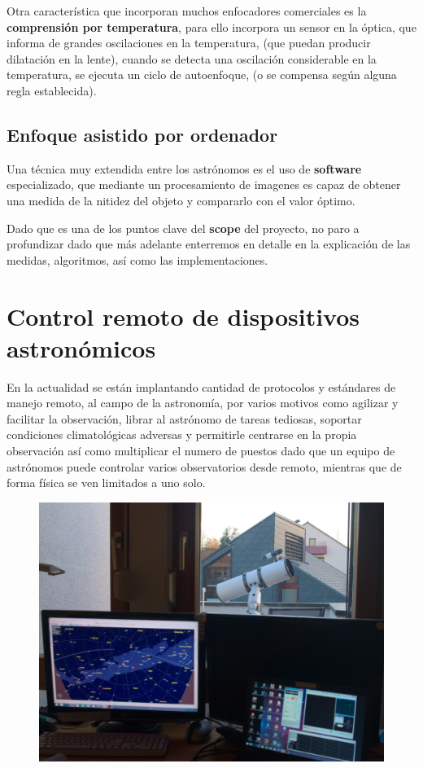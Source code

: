 \bigskip
Otra característica que incorporan muchos enfocadores comerciales es la \textbf{comprensión por temperatura}, para ello incorpora un sensor en la óptica, que informa de grandes oscilaciones en la temperatura, (que puedan producir dilatación en la lente), 
cuando se detecta una oscilación considerable en la temperatura, se ejecuta un ciclo de autoenfoque, (o se compensa según alguna regla establecida).


\subsection{Enfoque asistido por ordenador}

Una técnica muy extendida entre los astrónomos es el uso de \textbf{software} especializado, que mediante un procesamiento de imagenes es capaz de obtener una medida de la nitidez del objeto y compararlo con el valor óptimo.

\bigskip
Dado que es una de los puntos clave del \textbf{scope} del proyecto, no paro a profundizar dado que más adelante enterremos en detalle en la explicación de las medidas, algoritmos, así como las implementaciones.  


\newpage
\section{Control remoto de dispositivos astronómicos}

En la actualidad se están implantando cantidad de protocolos y estándares de manejo remoto, al campo de la astronomía, por varios  motivos como agilizar y facilitar la observación, librar al astrónomo de tareas tediosas, soportar condiciones climatológicas adversas y permitirle centrarse en la propia observación así como multiplicar el numero de puestos dado que un equipo de astrónomos puede controlar varios observatorios desde remoto, mientras que de forma física se ven limitados a uno solo. 

\begin{figure}[h]
\centering
\includegraphics[width=0.7\linewidth]{../images/robotizacion}
\caption{}
\label{fig:robotizacion}
\end{figure}

